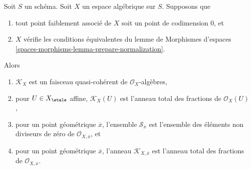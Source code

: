 \begin{lemma}
\label{lemma-meromorphic-quasi-coherent}
Soit $S$ un schéma. Soit $X$ un espace algébrique sur $S$. Supposons que
\begin{enumerate}
\item[(a)] tout point faiblement associé de $X$
soit un point de codimension $0$, et
\item[(b)] $X$ vérifie les conditions équivalentes
du lemme de Morphismes d'espaces
\ref{spaces-morphisms-lemma-prepare-normalization}.
\end{enumerate}
Alors
\begin{enumerate}
\item $\mathcal{K}_X$ est un faisceau quasi-cohérent de $\mathcal{O}_X$-algèbres,
\item pour $U \in X_\etale$ affine, $\mathcal{K}_X(U)$
est l'anneau total des fractions de $\mathcal{O}_X(U)$,
\item pour un point géométrique $\overline{x}$, l'ensemble
$\mathcal{S}_{\overline{x}}$
est l'ensemble des éléments non diviseurs de zéro de $\mathcal{O}_{X, \overline{x}}$, et
\item pour un point géométrique $\overline{x}$, l'anneau
$\mathcal{K}_{X, \overline{x}}$ est l'anneau total des fractions de
$\mathcal{O}_{X, \overline{x}}$.
\end{enumerate}
\end{lemma}


